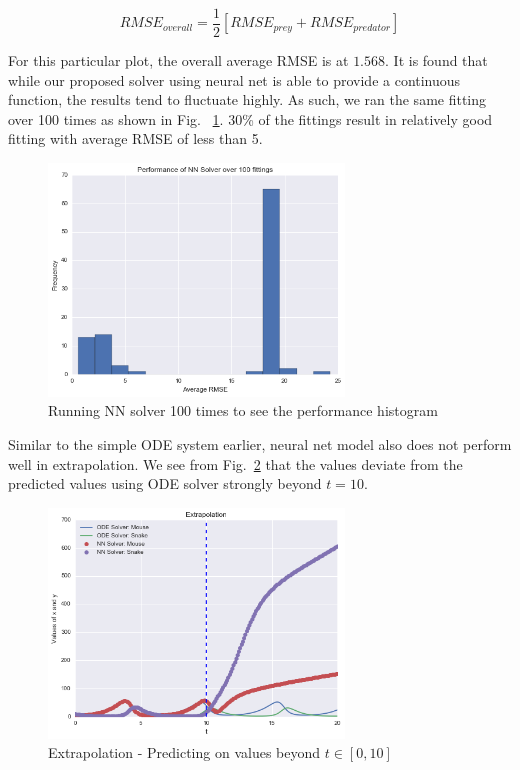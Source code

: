 \documentclass[11pt]{article}
\begin{document}
\begin{equation}
RMSE_{overall} = \frac{1}{2}[RMSE_{prey} + RMSE_{predator}]
\end{equation}

For this particular plot, the overall average RMSE is at $1.568$. It is found that while our proposed solver using neural net is able to provide a continuous function, the results tend to fluctuate highly. As such, we ran the same fitting over 100 times as shown in Fig. ~\ref{fig:perf_dist}. 30\% of the fittings result in relatively good fitting with average RMSE of less than 5.

\begin{figure}
\centering
\includegraphics[width=0.7\textwidth]{perf_distribution.png}
      \caption{Running NN solver 100 times to see the performance histogram \label{fig:perf_dist}}
\end{figure}

Similar to the simple ODE system earlier, neural net model also does not perform well in extrapolation. We see from Fig.~\ref{fig:LV2Extrap} that the values deviate from the predicted values using ODE solver strongly beyond $t = 10$.

\begin{figure}
\centering
\includegraphics[width=0.7\textwidth]{extrapo_LV2.png}
      \caption{Extrapolation - Predicting on values beyond $t\in [0, 10]$ \label{fig:LV2Extrap}}
\end{figure}
\end{document}
